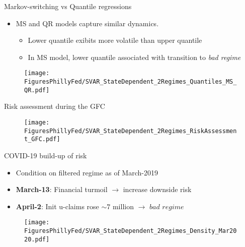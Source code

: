 \documentclass[xcolor=dvipsnames, xcolor=table, 10pt]{beamer}
\newcommand{\pb}[1]{{\color{fedblue}#1}}
\begin{document}

\begin{frame}{Markov-switching vs Quantile regressions}
\begin{itemize}
\item MS and QR models capture similar dynamics.
\medskip
\begin{itemize}
  \item Lower quantile exibits more volatile than upper quantile \citep{ABG19}
    \medskip
  \item In MS model, lower quantile associated with transition to \textit{bad regime}
\end{itemize}

\end{itemize}
\begin{figure}
    \texttt{[image: FiguresPhillyFed/SVAR\_StateDependent\_2Regimes\_Quantiles\_MS\_QR.pdf]}
\end{figure}
\end{frame}


\begin{frame}{Risk assessment during the GFC}

\begin{figure}
    \texttt{[image: FiguresPhillyFed/SVAR\_StateDependent\_2Regimes\_RiskAssessment\_GFC.pdf]}
\end{figure}
\end{frame}


\begin{frame}{COVID-19 build-up of risk}

\begin{itemize}
\item Condition on filtered regime as of March-2019
\medskip
\item \textbf{March-13}: Financial turmoil $\rightarrow$ increase downside risk
\medskip
\item \pb{\textbf{April-2}}: Init u-claims rose $\sim7$ million $\rightarrow$ $\textit{bad regime}$
\end{itemize}
\begin{figure}
    \texttt{[image: FiguresPhillyFed/SVAR\_StateDependent\_2Regimes\_Density\_Mar2020.pdf]}
\end{figure}
\end{frame}
\end{document}
